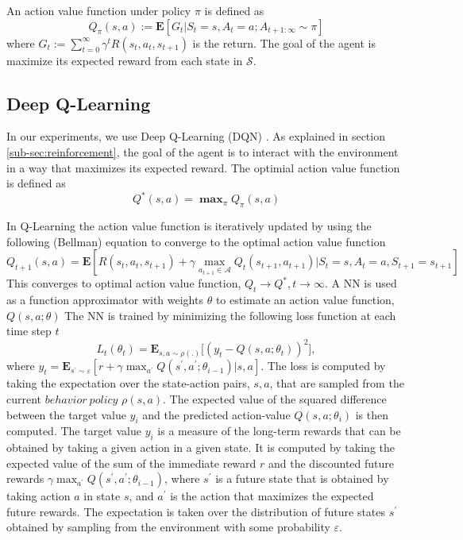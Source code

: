 \documentclass{article}
\newcommand{\cS}{\mathcal{S}}
\newcommand{\cA}{\mathcal{A}}
\begin{document}
An action value function under policy $\pi$ is defined as 
$$Q_\pi(s, a) := \mathbf{E}[G_t|S_t =s, A_t=a; A_{t+1: \infty} \sim \pi]$$
where $G_t := \sum_{t=0}^\infty \gamma^t R(s_t, a_t, s_{t+1})$ is the return.
The goal of the agent is maximize its expected reward from each state in $\cS$.

\subsection{Deep Q-Learning} \label{sub-sec:dqn}
In our experiments, we use Deep Q-Learning (DQN) \cite[]{mnih2013playing}. 
As explained in section \ref{sub-sec:reinforcement}, the goal of the agent is to interact with the environment in a way that maximizes its expected reward.
The optimial action value function is defined as
$$Q^*(s, a) = \mathbf \max_{\pi} Q_\pi(s, a)$$

In Q-Learning the action value function is iteratively updated by using the following (Bellman) equation to converge to the optimal action value function
$$Q_{t+1}(s, a) = \mathbf{E}[R(s_t, a_t, s_{t+1}) + \gamma \max_{a_{t+1} \in \cA} Q_t(s_{t+1}, a_{t+1})|S_t =s, A_t=a, S_{t+1}=s_{t+1}]$$
This converges to optimal action value function, $Q_t \rightarrow Q^*, t \rightarrow \infty$. 
A NN is used as a function approximator with weights $\theta$ to estimate an action value function, $Q(s, a; \theta)$
The NN is trained by minimizing the following loss function at each time step $t$
$$L_t(\theta_t) = \mathbf{E}_{s, a\sim \rho(.)}\big[(y_t - Q(s, a; \theta_t))^2\big],$$
where $y_t = \mathbf{E}_{s^\prime\sim\varepsilon}[r + \gamma \max_{a^\prime}Q(s^\prime, a^\prime; \theta_{i-1}) | s, a]$. 
The loss is computed by taking the expectation over the state-action pairs, $s, a$, that are sampled from the current $\mathit{behavior\ policy}$ $\rho(s, a)$. 
The expected value of the squared difference between the target value $y_i$ and the predicted action-value $Q(s, a; \theta_i)$ is then computed. 
The target value $y_i$ is a measure of the long-term rewards that can be obtained by taking a given action in a given state. 
It is computed by taking the expected value of the sum of the immediate reward $r$ and the discounted future rewards $\gamma \max_{a^\prime}Q(s^\prime, a^\prime; \theta_{i-1})$, where $s^\prime$ is a future state that is obtained by taking action $a$ in state $s$, and $a^\prime$ is the action that maximizes the expected future rewards. 
The expectation is taken over the distribution of future states $s^\prime$ obtained by sampling from the environment with some probability $\varepsilon$.
\end{document}
